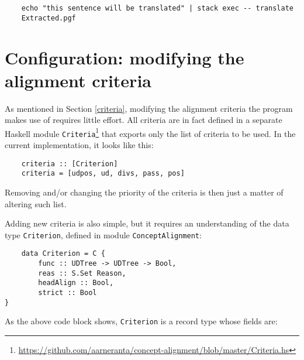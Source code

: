 \begin{verbatim}
    echo "this sentence will be translated" | stack exec -- translate
    Extracted.pgf             
\end{verbatim}

\section{Configuration: modifying the alignment criteria}
As mentioned in Section \ref{criteria}, modifying the alignment criteria the program makes use of requires little effort. 
All criteria are in fact defined in a separate Haskell module \texttt{Criteria}\footnote{\url{https://github.com/aarneranta/concept-alignment/blob/master/Criteria.hs}} that exports only the list of criteria to be used. 
In the current implementation, it looks like this: \smallskip

\begin{lstlisting}
    criteria :: [Criterion]
    criteria = [udpos, ud, divs, pass, pos]
\end{lstlisting}

Removing and/or changing the priority of the criteria is then just a matter of altering such list. \smallskip

Adding new criteria is also simple, but it requires an understanding of the data type \texttt{Criterion}, defined in module \texttt{ConceptAlignment}:

\begin{lstlisting}
    data Criterion = C {
        func :: UDTree -> UDTree -> Bool, 
        reas :: S.Set Reason,
        headAlign :: Bool,
        strict :: Bool
}
\end{lstlisting}

As the above code block shows, \texttt{Criterion} is a record type whose fields are:

